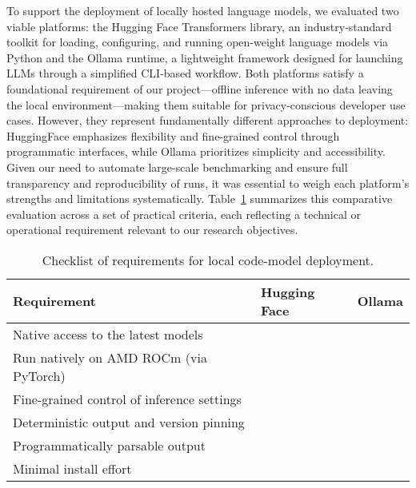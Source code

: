 To support the deployment of locally hosted language models, we evaluated two viable platforms: the Hugging Face Transformers library, an industry-standard toolkit for loading, configuring, and running open-weight language models via Python and the Ollama runtime, a lightweight framework designed for launching \glspl{LLM} through a simplified CLI-based workflow. Both platforms satisfy a foundational requirement of our project---offline inference with no data leaving the local environment---making them suitable for privacy-conscious developer use cases. However, they represent fundamentally different approaches to deployment: HuggingFace emphasizes flexibility and fine-grained control through programmatic interfaces, while Ollama prioritizes simplicity and accessibility. Given our need to automate large-scale benchmarking and ensure full transparency and reproducibility of runs, it was essential to weigh each platform’s strengths and limitations systematically. Table~\ref{tab:platform-checklist} summarizes this comparative evaluation across a set of practical criteria, each reflecting a technical or operational requirement relevant to our research objectives.

\begin{table}[ht]
	\centering
	\caption{Checklist of requirements for local code-model deployment.}
	\label{tab:platform-checklist}

	\renewcommand{\arraystretch}{1.2}      %
	\begin{tabularx}{\textwidth}{@{}X
		>{\centering\arraybackslash}p{3cm}
		>{\centering\arraybackslash}p{3cm}@{}}
		\toprule
		\textbf{Requirement}                       & \textbf{Hugging Face} & \textbf{Ollama} \\
		\midrule
		Native access to the latest models         & \checkYes             & \checkNo        \\
		Run natively on AMD ROCm (via PyTorch)     & \checkYes             & \checkNo        \\
		Fine-grained control of inference settings & \checkYes             & \checkNo        \\
		Deterministic output and version pinning   & \checkYes             & \checkNo        \\
		Programmatically parsable output           & \checkYes             & \checkNo        \\
		Minimal install effort                     & \checkYes             & \checkYes       \\
		\bottomrule
	\end{tabularx}
\end{table}


